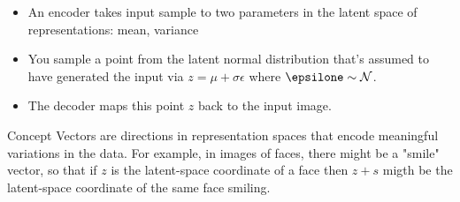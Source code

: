 \begin{itemize}
\item An encoder takes input sample to two parameters in the latent space of representations: mean, variance
\item You sample a point from the latent normal distribution that's assumed to have generated the input via $z = \mu + \sigma \epsilon$ where $\epsilone \sim \mathcal{N}$. 
\item The decoder maps this point $z$ back to the input image. 
\end{itemize} 

\label{Concept Vectors}
Concept Vectors are directions in representation spaces that encode meaningful variations in the data. For example, in images of faces, there might be a "smile" vector, so that if $z$ is the latent-space coordinate of a face then $z+s$ migth be the latent-space coordinate of the same face smiling. 
